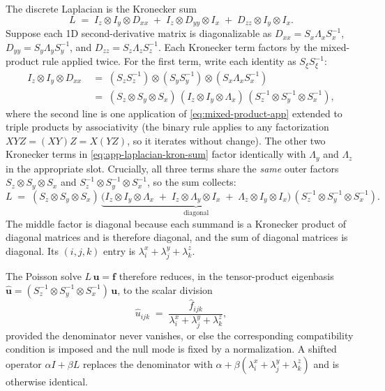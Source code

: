 \documentclass[11pt]{article}
\newcommand{\kron}{\otimes}
\newcommand{\Dxx}{D_{xx}}
\newcommand{\Dyy}{D_{yy}}
\newcommand{\Dzz}{D_{zz}}
\newcommand{\Ix}{I_{x}}
\newcommand{\Iy}{I_{y}}
\newcommand{\Iz}{I_{z}}
\begin{document}
\begin{appendices}
The discrete Laplacian is the Kronecker sum
\begin{equation}
\label{eq:app-laplacian-kron-sum}
  L
  \;=\; \Iz \kron \Iy \kron \Dxx
  \;+\; \Iz \kron \Dyy \kron \Ix
  \;+\; \Dzz \kron \Iy \kron \Ix.
\end{equation}
Suppose each 1D second-derivative matrix is diagonalizable as
$\Dxx = S_x \Lambda_x S_x^{-1}$, $\Dyy = S_y \Lambda_y S_y^{-1}$, and
$\Dzz = S_z \Lambda_z S_z^{-1}$.  Each Kronecker term factors by the
mixed-product rule applied twice.  For the first term, write each
identity as $S_\xi S_\xi^{-1}$:
\begin{align}
  \Iz \kron \Iy \kron \Dxx
  &\;=\;
  (S_z S_z^{-1}) \kron (S_y S_y^{-1}) \kron (S_x \Lambda_x S_x^{-1})
  \nonumber \\
  &\;=\;
  (S_z \kron S_y \kron S_x)\,
  (\Iz \kron \Iy \kron \Lambda_x)\,
  (S_z^{-1} \kron S_y^{-1} \kron S_x^{-1}),
  \label{eq:fastdiag-step}
\end{align}
where the second line is one application of
\eqref{eq:mixed-product-app} extended to triple products by
associativity (the binary rule applies to any factorization
$XYZ = (XY)Z = X(YZ)$, so it iterates without change).  The other two
Kronecker terms in \eqref{eq:app-laplacian-kron-sum} factor identically
with $\Lambda_y$ and $\Lambda_z$ in the appropriate slot.  Crucially,
all three terms share the \emph{same} outer factors
$S_z \kron S_y \kron S_x$ and
$S_z^{-1} \kron S_y^{-1} \kron S_x^{-1}$, so the sum collects:
\begin{equation}
\label{eq:fastdiag-factored}
  L
  \;=\;
  (S_z \kron S_y \kron S_x)\,
  \underbrace{\bigl(\Iz \kron \Iy \kron \Lambda_x \;+\; \Iz \kron \Lambda_y \kron \Ix \;+\; \Lambda_z \kron \Iy \kron \Ix\bigr)}_{\text{diagonal}}\,
  (S_z^{-1} \kron S_y^{-1} \kron S_x^{-1}).
\end{equation}
The middle factor is diagonal because each summand is a Kronecker
product of diagonal matrices and is therefore diagonal, and the sum
of diagonal matrices is diagonal.  Its $(i,j,k)$ entry is
$\lambda_i^x + \lambda_j^y + \lambda_k^z$.

The Poisson solve $L\,\bm{u} = \bm{f}$ therefore reduces, in the
tensor-product eigenbasis
$\hat{\bm{u}} = (S_z^{-1} \kron S_y^{-1} \kron S_x^{-1})\,\bm{u}$,
to the scalar division
\begin{equation}
\label{eq:app-fastdiag-final}
  \hat u_{ijk}
  \;=\;
  \frac{\hat f_{ijk}}{\lambda_i^x + \lambda_j^y + \lambda_k^z},
\end{equation}
provided the denominator never vanishes, or else the corresponding
compatibility condition is imposed and the null mode is fixed by a
normalization.  A shifted operator $\alpha I + \beta L$ replaces the
denominator with
$\alpha + \beta(\lambda_i^x + \lambda_j^y + \lambda_k^z)$ and is
otherwise identical.


\end{appendices}
\end{document}
